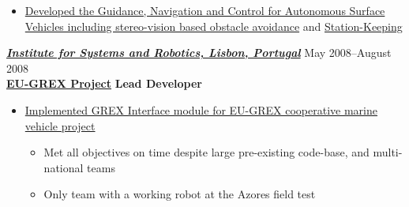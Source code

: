 \begin{itemize}
    \item \href{http://robotics.usc.edu/~ampereir/wordpress/?page_id=365}{Developed the Guidance, Navigation and Control for Autonomous Surface Vehicles  including stereo-vision based obstacle avoidance} and \href{http://robotics.usc.edu/~ampereir/wordpress/?page_id=373}{Station-Keeping}
 \iftoggle{detailedVersion}{\begin{itemize} \item[$\checkmark$] Took only 2 months to complete autonomy from RC-control to Mission control}{}
    \iftoggle{detailedVersion}{
   \begin{itemize}%
   \item[\tiny$\blacksquare$]  Required Control Systems, Robotics, Computer Networking, Computer Vision, Image Processing
   \iftoggle{detailedVersion}{
   \item[\tiny$\blacksquare$]  All code on robot written in C++ (Linux); OpenCV for vision. GUI written in C\# .Net (Windows); Prototyping in Matlab (Control Systems Toolbox, System Identification Toolbox) and Simulink}{}
    \end{itemize}
    }{}
    \iftoggle{detailedVersion}{\end{itemize}}{}
 \end{itemize}

\vspace{8pt}
{\sl \href{http://welcome.isr.ist.utl.pt/home/}{\textbf{Institute for Systems and Robotics, Lisbon, Portugal}}} \hfill May 2008--August 2008  \\[2pt]
\href{http://www.grex-project.eu/}{\textbf{EU-GREX Project}} \hfill   \textbf{ Lead Developer}
\begin{itemize} \itemsep -2pt
 \item \href{http://robotics.usc.edu/~ampereir/wordpress/?page_id=397}{Implemented GREX Interface module for EU-GREX cooperative marine vehicle project}
   \begin{itemize}
   \item[$\checkmark$] Met all objectives on time despite large pre-existing code-base, and multi-national teams
   \item[$\checkmark$] Only team with a working robot at the Azores field test
   \end{itemize}
\end{itemize} 

